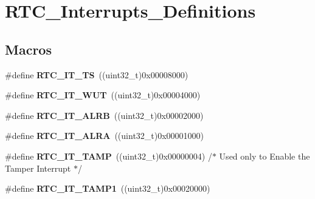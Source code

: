 \hypertarget{group___r_t_c___interrupts___definitions}{}\section{R\+T\+C\+\_\+\+Interrupts\+\_\+\+Definitions}
\label{group___r_t_c___interrupts___definitions}
\subsection*{Macros}
\begin{DoxyCompactItemize}
\item 
\hypertarget{group___r_t_c___interrupts___definitions_ga2c4632667c515e366a79df6341d5f3d1}{}\#define {\bfseries R\+T\+C\+\_\+\+I\+T\+\_\+\+T\+S}~((uint32\+\_\+t)0x00008000)\label{group___r_t_c___interrupts___definitions_ga2c4632667c515e366a79df6341d5f3d1}

\item 
\hypertarget{group___r_t_c___interrupts___definitions_gadc90686ace99992f4775c0198a1c6591}{}\#define {\bfseries R\+T\+C\+\_\+\+I\+T\+\_\+\+W\+U\+T}~((uint32\+\_\+t)0x00004000)\label{group___r_t_c___interrupts___definitions_gadc90686ace99992f4775c0198a1c6591}

\item 
\hypertarget{group___r_t_c___interrupts___definitions_gaeb47520af65e995ddad232f3a846aba8}{}\#define {\bfseries R\+T\+C\+\_\+\+I\+T\+\_\+\+A\+L\+R\+B}~((uint32\+\_\+t)0x00002000)\label{group___r_t_c___interrupts___definitions_gaeb47520af65e995ddad232f3a846aba8}

\item 
\hypertarget{group___r_t_c___interrupts___definitions_ga0ba352559e4eb6a5430e1254851a0dfb}{}\#define {\bfseries R\+T\+C\+\_\+\+I\+T\+\_\+\+A\+L\+R\+A}~((uint32\+\_\+t)0x00001000)\label{group___r_t_c___interrupts___definitions_ga0ba352559e4eb6a5430e1254851a0dfb}

\item 
\hypertarget{group___r_t_c___interrupts___definitions_gada511402e0227932824cdc95711ebd55}{}\#define {\bfseries R\+T\+C\+\_\+\+I\+T\+\_\+\+T\+A\+M\+P}~((uint32\+\_\+t)0x00000004) /$\ast$ Used only to Enable the Tamper Interrupt $\ast$/\label{group___r_t_c___interrupts___definitions_gada511402e0227932824cdc95711ebd55}

\item 
\hypertarget{group___r_t_c___interrupts___definitions_gaae1bc95e46b6951e45c4d857a6701a8a}{}\#define {\bfseries R\+T\+C\+\_\+\+I\+T\+\_\+\+T\+A\+M\+P1}~((uint32\+\_\+t)0x00020000)\label{group___r_t_c___interrupts___definitions_gaae1bc95e46b6951e45c4d857a6701a8a}


\end{DoxyCompactItemize}
